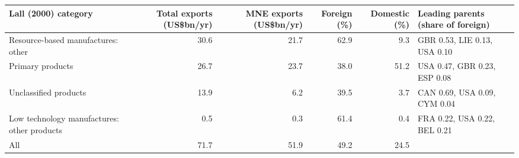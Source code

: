 \begin{tabular}{@{}l r r r r l@{}}
\toprule
Lall (2000) category & Total exports (US\$bn/yr) & MNE exports (US\$bn/yr) & Foreign (\%) & Domestic (\%) & Leading parents (share of foreign) \\
\midrule
Resource-based manufactures: other & 30.6 & 21.7 & 62.9 & 9.3 & GBR 0.53, LIE 0.13, USA 0.10 \\
Primary products & 26.7 & 23.7 & 38.0 & 51.2 & USA 0.47, GBR 0.23, ESP 0.08 \\
Unclassified products & 13.9 & 6.2 & 39.5 & 3.7 & CAN 0.69, USA 0.09, CYM 0.04 \\
Low technology manufactures: other products & 0.5 & 0.3 & 61.4 & 0.4 & FRA 0.22, USA 0.22, BEL 0.21 \\
\midrule
All & 71.7 & 51.9 & 49.2 & 24.5 & \\
\bottomrule
\end{tabular}
